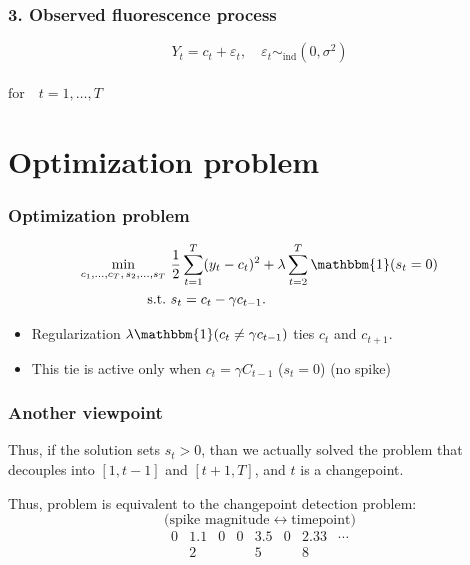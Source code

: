 \documentclass[20pt]{beamer}
\theoremstyle{definition}
\begin{document}
	
	\begin{frame}
		\frametitle{3. Observed fluorescence process}
	\[
	Y_t = c_t + \varepsilon_t, \quad \varepsilon_t \sim_{\text{ind}} (0, \sigma^2)
	\]
	\\
	$\text{for} \quad t = 1, \ldots, T$
\end{frame}

\section{Optimization problem}
\begin{frame}
	\frametitle{Optimization problem}
\small
\begin{align*}
	\min_{c_1, \ldots, c_T,\, s_2, \ldots, s_T}~& \frac{1}{2} \sum_{t=1}^T (y_t - c_t)^2 + \lambda \sum_{t=2}^T 
	\mathbbm{1}(s_t = 0) \\
	\text{s.t.}~& s_t = c_t - \gamma c_{t-1}.
\end{align*}
\begin{itemize}
	\item Regularization $\lambda \mathbbm{1}(c_t \neq \gamma c_{t-1})$ ties $c_t$ and $c_{t+1}$.
	\item This tie is active only when $c_t = \gamma C_{t-1}$ ($s_t = 0$) (no spike)
\end{itemize}


\end{frame}

\begin{frame}
	\frametitle{Another viewpoint}

		Thus, if the solution sets $s_t > 0$, than we actually solved the problem that decouples into $[1, t-1]$ and $[t+1, T]$, and $t$ is a changepoint.

\end{frame}


\begin{frame}

Thus, problem is equivalent to the changepoint detection problem:
\[
\text{(spike magnitude} \;\longleftrightarrow\; \text{timepoint)}
\]
\[
\begin{array}{ccccccccc}
	0 & 1.1 & 0 & 0 & 3.5 & 0 & 2.33 & \cdots \\
	& 2 &  &  & 5 &  & 8 & 
\end{array}
\]

 
\end{frame}
\end{document}

